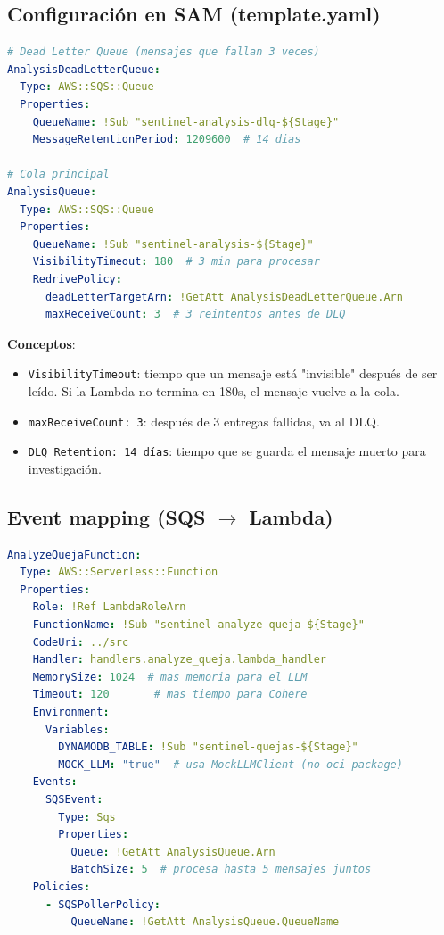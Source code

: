 \documentclass[11pt,a4paper,oneside]{article}
\begin{document}
\subsection{Configuraci\'on en SAM (template.yaml)}

\begin{lstlisting}[language=yaml,caption={infra/template.yaml --- SQS}]
# Dead Letter Queue (mensajes que fallan 3 veces)
AnalysisDeadLetterQueue:
  Type: AWS::SQS::Queue
  Properties:
    QueueName: !Sub "sentinel-analysis-dlq-${Stage}"
    MessageRetentionPeriod: 1209600  # 14 dias

# Cola principal
AnalysisQueue:
  Type: AWS::SQS::Queue
  Properties:
    QueueName: !Sub "sentinel-analysis-${Stage}"
    VisibilityTimeout: 180  # 3 min para procesar
    RedrivePolicy:
      deadLetterTargetArn: !GetAtt AnalysisDeadLetterQueue.Arn
      maxReceiveCount: 3  # 3 reintentos antes de DLQ
\end{lstlisting}

\textbf{Conceptos}:
\begin{itemize}
  \item \texttt{VisibilityTimeout}: tiempo que un mensaje est\'a "invisible" despu\'es de ser le\'ido. Si la Lambda no termina en 180s, el mensaje vuelve a la cola.
  \item \texttt{maxReceiveCount: 3}: despu\'es de 3 entregas fallidas, va al DLQ.
  \item \texttt{DLQ Retention: 14 d\'ias}: tiempo que se guarda el mensaje muerto para investigaci\'on.
\end{itemize}

\subsection{Event mapping (SQS $\rightarrow$ Lambda)}

\begin{lstlisting}[language=yaml,caption={infra/template.yaml --- Lambda consumer}]
AnalyzeQuejaFunction:
  Type: AWS::Serverless::Function
  Properties:
    Role: !Ref LambdaRoleArn
    FunctionName: !Sub "sentinel-analyze-queja-${Stage}"
    CodeUri: ../src
    Handler: handlers.analyze_queja.lambda_handler
    MemorySize: 1024  # mas memoria para el LLM
    Timeout: 120       # mas tiempo para Cohere
    Environment:
      Variables:
        DYNAMODB_TABLE: !Sub "sentinel-quejas-${Stage}"
        MOCK_LLM: "true"  # usa MockLLMClient (no oci package)
    Events:
      SQSEvent:
        Type: Sqs
        Properties:
          Queue: !GetAtt AnalysisQueue.Arn
          BatchSize: 5  # procesa hasta 5 mensajes juntos
    Policies:
      - SQSPollerPolicy:
          QueueName: !GetAtt AnalysisQueue.QueueName
\end{lstlisting}
\end{document}
